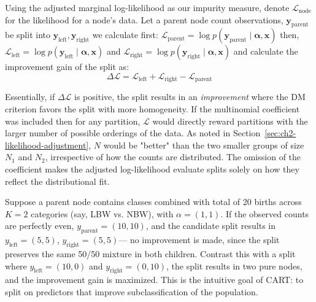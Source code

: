 Using the adjusted marginal log-likelihood as our impurity measure, denote \(\mathcal{L}_{\text{node}}\) for the likelihood for a node's data. Let a parent node count observations, \(\mathbf{y}_{\text{parent}}\) be split into  \(\mathbf{y}_{\text{left}},\mathbf{y}_{\text{right}}\)  we calculate first: \( 
    \mathcal{L}_{\text{parent}} = \log p(\mathbf{y}_{\text{parent}} \mid \boldsymbol{\alpha}, \mathbf{x})
\) then, 
\(
    \mathcal{L}_{\text{left}} = \log p(\mathbf{y}_{\text{left}} \mid \boldsymbol{\alpha},\mathbf{x})
\)
and 
\(
    \mathcal{L}_{\text{right}} = \log p(\mathbf{y}_{\text{right}} \mid \boldsymbol{\alpha},\mathbf{x})
\) and calculate the improvement gain of the split as: 
\[
    \Delta \mathcal{L} = \mathcal{L}_{\text{left}} + \mathcal{L}_{\text{right}} - \mathcal{L}_{\text{parent}}
\]

Essentially, if \(\Delta\mathcal{L}\) is positive, the split results in an \emph{improvement} where the DM criterion favors the split with more homogeneity. If the multinomial coefficient was included then for any partition, \(\mathcal{L}\) would directly reward partitions with the larger number of possible orderings of the data. As noted in Section~\ref{sec:ch2-likelihood-adjustment}, \(N\) would be "better" than the two smaller groups of size \(N_1\) and \(N_2\), irrespective of how the counts are distributed. The omission of the coefficient makes the adjusted log-likelihood evaluate splits solely on how they reflect the distributional fit. 

Suppose a parent node contains classes combined with total of 20 births across \(K=2\) categories (say, LBW vs. NBW), with \(\alpha = (1,1)\). If the observed counts are perfectly even, \(y_\text{parent} = (10,10)\), and the candidate split results in \(y_\text{left} = (5,5)\), \(y_\text{right} = (5,5)\)— no improvement is made, since the split preserves the same 50/50 mixture in both children. Contrast this with a split where \(y_\text{left} = (10,0)\) and \(y_\text{right} = (0,10)\), the split results in two pure nodes, and the improvement gain is maximized. This is the intuitive goal of CART: to split on predictors that improve subclassification of the population.




